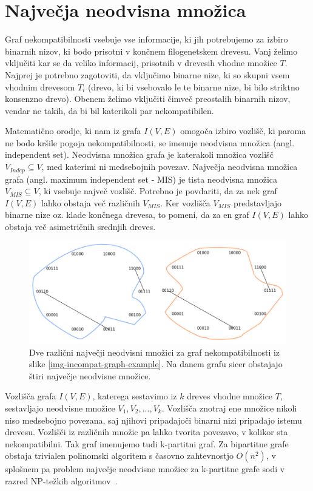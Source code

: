 \documentclass[a4paper, 12pt]{book}
\begin{document}
\section{Največja neodvisna množica}
Graf nekompatibilnosti vsebuje vse informacije, ki jih potrebujemo za izbiro binarnih nizov, ki bodo prisotni v končnem filogenetskem drevesu. Vanj želimo vključiti kar se da veliko informacij, prisotnih v drevesih vhodne množice $T$. Najprej je potrebno zagotoviti, da vključimo binarne nize, ki so skupni vsem vhodnim drevesom $T_i$ (drevo, ki bi vsebovalo le te binarne nize, bi bilo striktno konsenzno drevo). Obenem želimo vključiti čimveč preostalih binarnih nizov, vendar ne takih, da bi bil katerikoli par nekompatibilen. 

Matematično orodje, ki nam iz grafa $I(V, E)$ omogoča izbiro vozlišč, ki paroma ne bodo kršile pogoja nekompatibilnosti, se imenuje neodvisna množica (angl. independent set). Neodvisna množica grafa je katerakoli množica vozlišč $V_{Indep} \subseteq V$, med katerimi ni medsebojnih povezav. Največja neodvisna množica grafa (angl. maximum independent set - MIS) je tista neodvisna množica $V_{MIS} \subseteq V$, ki vsebuje največ vozlišč. Potrebno je povdariti, da za nek graf $I(V, E)$ lahko obstaja več različnih $V_{MIS}$. Ker vozlišča $V_{MIS}$ predstavljajo binarne nize oz. klade končnega drevesa, to pomeni, da za en graf $I(V, E)$ lahko obstaja več asimetričnih srednjih dreves.

\begin{figure}
	\begin{center}
		\includegraphics[scale=0.46]{gfx/incompat_graphs_pair.png}
	\end{center}
	\caption{Dve različni največji neodvisni množici za graf nekompatibilnosti iz slike \ref{img-incompat-graph-example}. Na danem grafu sicer obstajajo štiri največje neodvisne množice.}
	\label{img-mis-examples}
\end{figure}

Vozlišča grafa $I(V, E)$, katerega sestavimo iz $k$ dreves vhodne množice $T$, sestavljajo neodvisne množice $V_1, V_2, ..., V_k$. Vozlišča znotraj ene množice nikoli niso medsebojno povezana, saj njihovi pripadajoči binarni nizi pripadajo istemu drevesu. Vozlišči iz različnih množic pa lahko tvorita povezavo, v kolikor sta nekompatibilni. Tak graf imenujemo tudi k-partitni graf. Za bipartitne grafe obstaja trivialen polinomski algoritem s časovno zahtevnostjo $O(n^2)$, v splošnem pa problem največje neodvisne množice za k-partitne grafe sodi v razred NP-težkih algoritmov~\cite{pw}. 
\end{document}
